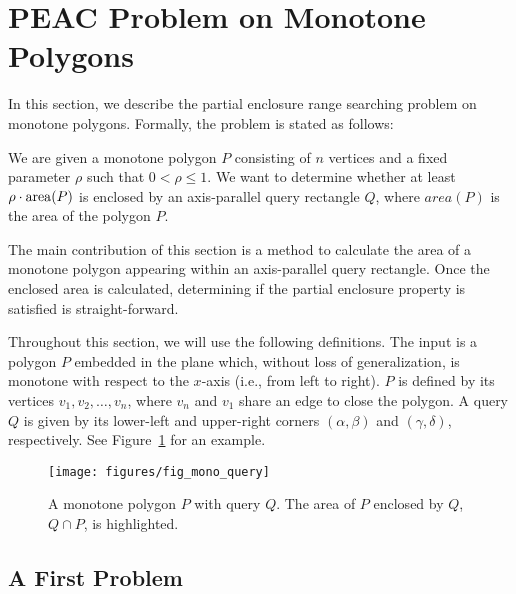 \section{PEAC Problem on Monotone Polygons}
\label{:monotonep}


In this section, we describe the partial enclosure range searching problem on 
monotone polygons. Formally, the 
problem is stated as follows:

\begin{problem}
We are given a monotone polygon $P$ consisting of $n$ vertices and a fixed 
parameter $\rho$ such that $0 < \rho \leq 1$. 
We want to determine whether at least $\rho \cdot \operatorname{area}\!\left(P\right)$ is enclosed by an 
axis-parallel query rectangle $Q$, where $area(P)$ is the area of the polygon $P$.
\end{problem}

The main contribution of this section is a method to calculate the area of a 
monotone polygon appearing within an axis-parallel query rectangle. 
Once the enclosed area is calculated, determining if the partial enclosure 
property is satisfied is straight-forward.

Throughout this section, we will use the following definitions.
The input is a polygon $P$ embedded in the plane which, without loss of 
generalization, is monotone with respect to the $x$-axis (i.e., from left to 
right). 
$P$ is defined by its vertices $v_1, v_2, \ldots, v_n$, where $v_n$ and $v_1$ 
share an edge to close the polygon.
A query $Q$ is given by its lower-left and upper-right corners $(\alpha, \beta)$ 
and $(\gamma, \delta)$, respectively. See 
Figure~\ref{fig:monotonep:query-example} for an example.

\begin{figure}[t]
\begin{center}
  \texttt{[image: figures/fig\_mono\_query]}
  \caption[A monotone polygon $P$ with query $Q$.]{A monotone polygon $P$ with 
query $Q$. The area of $P$ enclosed by $Q$, $Q \cap P$, is highlighted.}
  \label{fig:monotonep:query-example}
\end{center}
\end{figure}


\subsection{A First Problem}
\label{:monotonep:approach}


